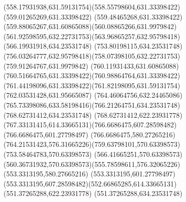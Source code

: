 {{\curveto(558.17931938,631.59131754)(558.55798604,631.33398422)(559.01265269,631.33398422)
\curveto(559.48465268,631.33398422)(559.88065267,631.60865088)(560.08865266,631.9979842)
\curveto(561.92598595,632.22731753)(563.96865257,632.95798418)(566.19931918,634.23531748)
\lineto(753.80198115,634.23531748)
\curveto(756.03264777,632.95798418)(758.07398105,632.22731753)(759.91264767,631.9979842)
\curveto(760.11931433,631.60865088)(760.51664765,631.33398422)(760.98864764,631.33398422)
\curveto(761.44198096,631.33398422)(761.82198095,631.59131754)(762.03531428,631.95665087)
\curveto(764.46064756,632.24465086)(765.73398086,633.58198416)(766.21264751,634.23531748)
\lineto(768.62731412,634.23531748)
\lineto(768.62731412,622.23931778)
\curveto(767.33131415,614.33665131)(766.6686475,607.28598482)(766.6686475,601.27798497)
\lineto(766.6686475,580.27265216)
\curveto(764.21531423,576.31665226)(759.63798101,570.63398573)(753.58464783,570.63398573)
\lineto(566.41665251,570.63398573)
\curveto(560.36731932,570.63398573)(555.78598611,576.32065226)(553.3313195,580.27665216)
\lineto(553.3313195,601.27798497)
\curveto(553.3313195,607.28598482)(552.66865285,614.33665131)(551.37265288,622.23931778)
\lineto(551.37265288,634.23531748)
\closepath
}
}

